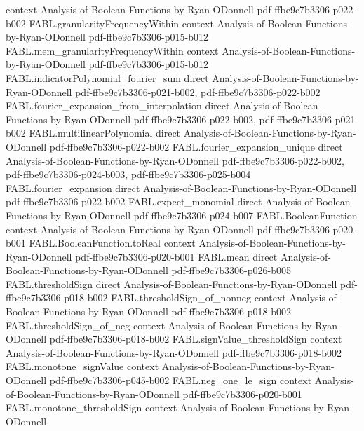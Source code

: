 \begin{theorem}
  {context}
  {Analysis-of-Boolean-Functions-by-Ryan-ODonnell}
  {pdf-ffbe9c7b3306-p022-b002}
\proofstep
  {FABL.granularityFrequencyWithin}
  {context}
  {Analysis-of-Boolean-Functions-by-Ryan-ODonnell}
  {pdf-ffbe9c7b3306-p015-b012}
\proofstep
  {FABL.mem_granularityFrequencyWithin}
  {context}
  {Analysis-of-Boolean-Functions-by-Ryan-ODonnell}
  {pdf-ffbe9c7b3306-p015-b012}
\proofstep
  {FABL.indicatorPolynomial_fourier_sum}
  {direct}
  {Analysis-of-Boolean-Functions-by-Ryan-ODonnell}
  {pdf-ffbe9c7b3306-p021-b002,
    pdf-ffbe9c7b3306-p022-b002}
\proofstep
  {FABL.fourier_expansion_from_interpolation}
  {direct}
  {Analysis-of-Boolean-Functions-by-Ryan-ODonnell}
  {pdf-ffbe9c7b3306-p022-b002,
    pdf-ffbe9c7b3306-p021-b002}
\proofstep
  {FABL.multilinearPolynomial}
  {direct}
  {Analysis-of-Boolean-Functions-by-Ryan-ODonnell}
  {pdf-ffbe9c7b3306-p022-b002}
\proofstep
  {FABL.fourier_expansion_unique}
  {direct}
  {Analysis-of-Boolean-Functions-by-Ryan-ODonnell}
  {pdf-ffbe9c7b3306-p022-b002,
    pdf-ffbe9c7b3306-p024-b003,
    pdf-ffbe9c7b3306-p025-b004}
\proofstep
  {FABL.fourier_expansion}
  {direct}
  {Analysis-of-Boolean-Functions-by-Ryan-ODonnell}
  {pdf-ffbe9c7b3306-p022-b002}
\proofstep
  {FABL.expect_monomial}
  {direct}
  {Analysis-of-Boolean-Functions-by-Ryan-ODonnell}
  {pdf-ffbe9c7b3306-p024-b007}
\proofstep
  {FABL.BooleanFunction}
  {context}
  {Analysis-of-Boolean-Functions-by-Ryan-ODonnell}
  {pdf-ffbe9c7b3306-p020-b001}
\proofstep
  {FABL.BooleanFunction.toReal}
  {context}
  {Analysis-of-Boolean-Functions-by-Ryan-ODonnell}
  {pdf-ffbe9c7b3306-p020-b001}
\proofstep
  {FABL.mean}
  {direct}
  {Analysis-of-Boolean-Functions-by-Ryan-ODonnell}
  {pdf-ffbe9c7b3306-p026-b005}
\proofstep
  {FABL.thresholdSign}
  {direct}
  {Analysis-of-Boolean-Functions-by-Ryan-ODonnell}
  {pdf-ffbe9c7b3306-p018-b002}
\proofstep
  {FABL.thresholdSign_of_nonneg}
  {context}
  {Analysis-of-Boolean-Functions-by-Ryan-ODonnell}
  {pdf-ffbe9c7b3306-p018-b002}
\proofstep
  {FABL.thresholdSign_of_neg}
  {context}
  {Analysis-of-Boolean-Functions-by-Ryan-ODonnell}
  {pdf-ffbe9c7b3306-p018-b002}
\proofstep
  {FABL.signValue_thresholdSign}
  {context}
  {Analysis-of-Boolean-Functions-by-Ryan-ODonnell}
  {pdf-ffbe9c7b3306-p018-b002}
\proofstep
  {FABL.monotone_signValue}
  {context}
  {Analysis-of-Boolean-Functions-by-Ryan-ODonnell}
  {pdf-ffbe9c7b3306-p045-b002}
\proofstep
  {FABL.neg_one_le_sign}
  {context}
  {Analysis-of-Boolean-Functions-by-Ryan-ODonnell}
  {pdf-ffbe9c7b3306-p020-b001}
\proofstep
  {FABL.monotone_thresholdSign}
  {context}
  {Analysis-of-Boolean-Functions-by-Ryan-ODonnell}

\end{theorem}

